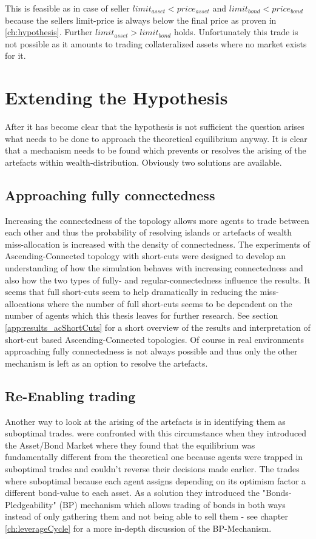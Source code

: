 \documentclass[Bachelorarbeit.tex]{subfiles}
\begin{document}
This is feasible as in case of seller $limit_{asset} < price_{asset}$ and $limit_{bond} < price_{bond}$ because the sellers limit-price is always below the final price as proven in \ref{ch:hypothesis}. Further $limit_{asset} > limit_{bond}$ holds. Unfortunately this trade is not possible as it amounts to trading collateralized assets where no market exists for it.

\section{Extending the Hypothesis}
After it has become clear that the hypothesis is not sufficient the question arises what needs to be done to approach the theoretical equilibrium anyway. It is clear that a mechanism needs to be found which prevents or resolves the arising of the artefacts within wealth-distribution. Obviously two solutions are available.

\subsection{Approaching fully connectedness}
Increasing the connectedness of the topology allows more agents to trade between each other and thus the probability of resolving islands or artefacts of wealth miss-allocation is increased with the density of connectedness. The experiments of Ascending-Connected topology with short-cuts were designed to develop an understanding of how the simulation behaves with increasing connectedness and also how the two types of  fully- and regular-connectedness influence the results. It seems that full short-cuts seem to help dramatically in reducing the miss-allocations where the number of full short-cuts seems to be dependent on the number of agents which this thesis leaves for further research. See section \ref{app:results_acShortCuts} for a short overview of the results and interpretation of short-cut based Ascending-Connected topologies.
\linebreak
Of course in real environments approaching fully connectedness is not always possible and thus only the other mechanism is left as an option to resolve the artefacts.

\subsection{Re-Enabling trading}
\label{ch:interpretation_reenablingTrading}
Another way to look at the arising of the artefacts is in identifying them as suboptimal trades. \cite{Breuer2015} were confronted with this circumstance when they introduced the Asset/Bond Market where they found that the equilibrium was fundamentally different from the theoretical one because agents were trapped in suboptimal trades and couldn't reverse their decisions made earlier. The trades where suboptimal because each agent assigns depending on its optimism factor a different bond-value to each asset. As a solution they introduced the "Bonds-Pledgeability" (BP) mechanism which allows trading of bonds in both ways instead of only gathering them and not being able to sell them - see chapter \ref{ch:leverageCycle} for a more in-depth discussion of the BP-Mechanism.
\end{document}
